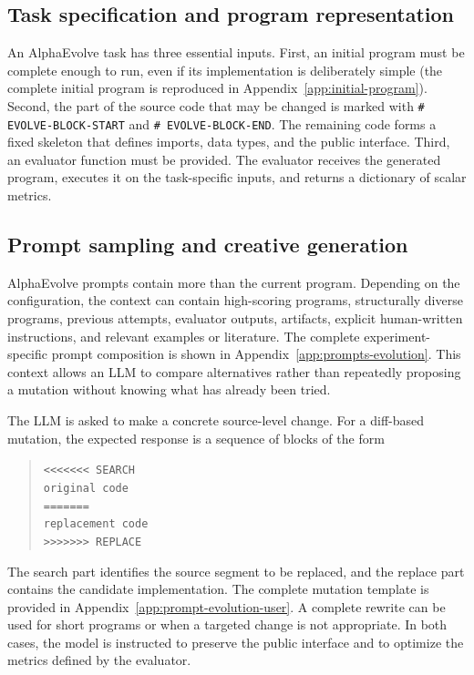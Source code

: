 \subsection{Task specification and program representation}

An AlphaEvolve task has three essential inputs. First, an initial program must
be complete enough to run, even if its implementation is deliberately simple
(the complete initial program is reproduced in Appendix~\ref{app:initial-program}).
Second, the part of the source code that may be changed is marked with
\texttt{\# EVOLVE-BLOCK-START} and \texttt{\# EVOLVE-BLOCK-END}. The remaining
code forms a fixed skeleton that defines imports, data types, and the public
interface. Third, an evaluator function must be provided. The evaluator
receives the generated program, executes it on the task-specific inputs, and
returns a dictionary of scalar metrics.

\subsection{Prompt sampling and creative generation}

AlphaEvolve prompts contain more than the current program. Depending on the
configuration, the context can contain high-scoring programs, structurally
diverse programs, previous attempts, evaluator outputs, artifacts, explicit
human-written instructions, and relevant examples or literature. The complete
experiment-specific prompt composition is shown in Appendix~\ref{app:prompts-evolution}.
This context allows an LLM to compare alternatives rather than repeatedly
proposing a mutation without knowing what has already been tried.

The LLM is asked to make a concrete source-level change. For a diff-based
mutation, the expected response is a sequence of blocks of the form
\begin{quote}
\texttt{<<<<<<< SEARCH}\\
\texttt{original code}\\
\texttt{=======}\\
\texttt{replacement code}\\
\texttt{>>>>>>> REPLACE}
\end{quote}
The search part identifies the source segment to be replaced, and the replace
part contains the candidate implementation. The complete mutation template is
provided in Appendix~\ref{app:prompt-evolution-user}. A complete rewrite can be used for
short programs or when a targeted change is not appropriate. In both cases,
the model is instructed to preserve the public interface and to optimize the
metrics defined by the evaluator.

